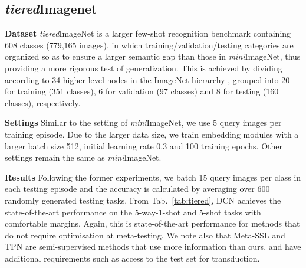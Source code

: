 \documentclass[conference]{IEEEtran}
\def\modelnameshort{DCN}
\def\tierIN{\textit{tiered}ImageNet}
\def\miniIN{\textit{mini}ImageNet}
\newcommand{\keypoint}[1]{\vspace{0.05cm}\noindent\textbf{#1}\quad}
\begin{document}
\subsection{\textit{tiered}Imagenet}
\keypoint{Dataset}
\tierIN{} is a larger few-shot recognition benchmark containing 608 classes (779,165 images), in which training/validation/testing categories are organized so as to ensure a larger semantic gap than those in \miniIN{}, thus providing a more rigorous test of generalization. This is achieved by dividing according to 34-higher-level nodes in the ImageNet hierarchy \cite{ren2018meta}, grouped into 20 for training (351 classes), 6 for validation (97 classes) and 8 for testing (160 classes), respectively.

\keypoint{Settings}
Similar to the setting of \miniIN{}, we use 5 query images per training episode. Due to the larger data size, we train embedding modules with a larger batch size 512, initial learning rate 0.3 and 100 training epochs. Other settings remain the same as \miniIN{}.

\keypoint{Results}
Following the former experiments, we batch 15 query images per class in each testing episode and the accuracy is calculated by averaging over 600 randomly generated testing tasks. From Tab.~\ref{tab:tiered}, \modelnameshort{} achieves the state-of-the-art performance on the 5-way-1-shot and 5-shot tasks with comfortable margins. Again, this is state-of-the-art performance for methods that do not require optimisation at meta-testing. We note also that Meta-SSL \cite{ren2018meta} and TPN \cite{liu2018transductive} are semi-supervised methods that use more information than ours, and have additional requirements such as access to the test set for transduction.
\end{document}
